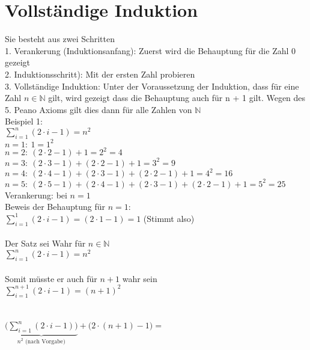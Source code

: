 \documentclass[a4paper]{scrartcl}
\begin{document}
\section{Vollständige Induktion}
Sie besteht aus zwei Schritten \\
1. Verankerung (Induktionsanfang): Zuerst wird die Behauptung für die Zahl 0 gezeigt \\
2. Induktionsschritt): Mit der ersten Zahl probieren \\
3. Vollständige Induktion: Unter der Voraussetzung der Induktion, dass für eine Zahl $n \in \mathbb{N}$ gilt, wird gezeigt dass die Behauptung auch für n + 1 gilt. Wegen des 5. Peano Axioms gilt dies dann für alle Zahlen von $\mathbb{N}$ \\
\newline
Beispiel 1: \\
$\sum\limits_{i=1}^n (2 \cdot i -1) = n^2$ \\ \newline
$n=1: \ 1 = 1^2$ \\ 
$n=2: \ (2 \cdot 2 - 1) + 1 = 2^2 = 4$ \\ 
$n=3: \ (2 \cdot 3 - 1) + (2 \cdot 2 - 1) + 1 = 3^2 =  9$\\ 
$n=4: \ (2 \cdot 4 - 1) + (2 \cdot 3 - 1) + (2 \cdot 2 - 1) + 1 = 4^2 = 16$ \\  
$n=5: \ (2 \cdot 5 - 1) + (2 \cdot 4 - 1) + (2 \cdot 3 - 1) + (2 \cdot 2 - 1) + 1 = 5^2 = 25$ \\  \newline
\newline
Verankerung: bei $n=1$ \\
Beweis der Behauptung für $n=1:$\\ \newline
$\sum\limits_{i=1}^1 (2 \cdot i -1) = (2 \cdot 1 - 1) = 1$ (Stimmt also) \\
\\
Der Satz sei Wahr für $n \in \mathbb{N}$\\ \newline
$\sum\limits_{i=1}^n (2 \cdot i -1) =n^2$ \\
\\
Somit müsste er auch für $n+1$ wahr sein \\ \newline
$\sum\limits_{i=1}^{n+1} (2 \cdot i -1) =(n+1)^2$ \\ \\ \\ $\underbrace{\big(\sum\limits_{i=1}^{n} (2 \cdot i -1)\big)}_{n^2 \text{ (nach Vorgabe)}} +\big( 2 \cdot (n+1) - 1 \big) =$ \\ \\ \\
\end{document}
